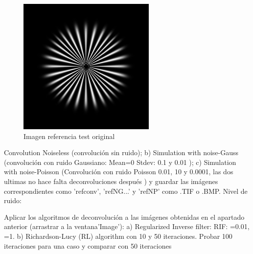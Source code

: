 \documentclass{./packages/optica-article}
\begin{document}
{     \begin{figure}[h]
    \centering
    \includegraphics[scale=0.5]{Simulation deconvolution/ref.jpg}
    \caption{Imagen referencia test original}
    \label{f:REF}
    \end{figure}

      Convolution Noiseless (convolución sin ruido);
        b) Simulation with noise-Gauss (convolución con ruido Gaussiano: 
        Mean=0
        Stdev: 0.1 y 0.01 );
        c) Simulation with noise-Poisson (Convolución con ruido Poisson 0.01, 10 y 0.0001, las dos ultimas no
        hace falta deconvoluciones después ) y guardar las imágenes correspondientes como ’refconv’, ’refNG...’ y ’refNP’ como .TIF o .BMP. 
        Nivel de ruido:
		\item Aplicar los algoritmos de deconvolución a las imágenes obtenidas en el apartado anterior (arrastrar a la ventana’Image’): 
		a) Regularized Inverse filter: 
		RIF: =0.01, =1. 
		b) Richardson-Lucy (RL) algorithm con 10 y 50 iteraciones. Probar 100 iteraciones para una caso y comparar con 50 iteraciones

	}

\end{document}
